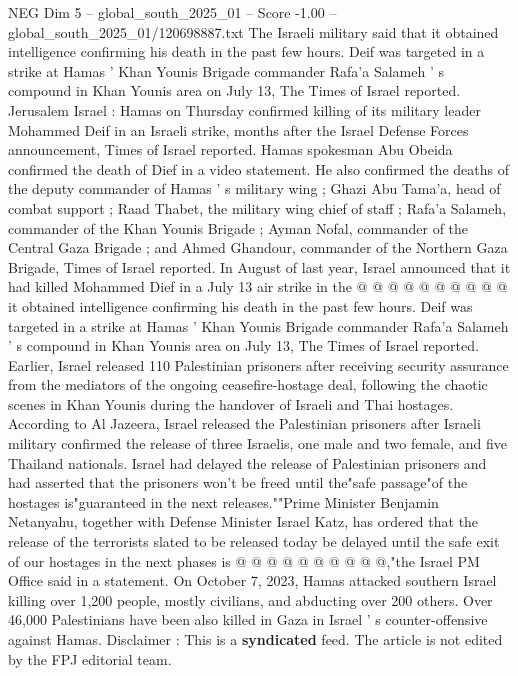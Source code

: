 \begin{textsample}{NEG Dim 5 – global\_south\_2025\_01 – Score -1.00 – global\_south\_2025\_01/120698887.txt}  \label{ex:f5_neg_151}
The Israeli military said that it obtained intelligence confirming his death in the past few hours.
Deif was targeted in a strike at Hamas ' Khan Younis Brigade commander Rafa'a Salameh ' s compound in Khan Younis area on July 13, The Times of Israel reported.
Jerusalem Israel : Hamas on Thursday confirmed killing of its military leader Mohammed Deif in an Israeli strike, months after the Israel Defense Forces announcement, Times of Israel reported.
Hamas spokesman Abu Obeida confirmed the death of Dief in a video statement.
He also confirmed the deaths of the deputy commander of Hamas ' s military wing ; Ghazi Abu Tama'a, head of combat support ; Raad Thabet, the military wing chief of staff ; Rafa'a Salameh, commander of the Khan Younis Brigade ; Ayman Nofal, commander of the Central Gaza Brigade ; and Ahmed Ghandour, commander of the Northern Gaza Brigade, Times of Israel reported.
In August of last year, Israel announced that it had killed Mohammed Dief in a July 13 air strike in the @ @ @ @ @ @ @ @ @ @ it obtained intelligence confirming his death in the past few hours.
Deif was targeted in a strike at Hamas ' Khan Younis Brigade commander Rafa'a Salameh ' s compound in Khan Younis area on July 13, The Times of Israel reported.
Earlier, Israel released 110 Palestinian prisoners after receiving security assurance from the mediators of the ongoing ceasefire-hostage deal, following the chaotic scenes in Khan Younis during the handover of Israeli and Thai hostages.
According to Al Jazeera, Israel released the Palestinian prisoners after Israeli military confirmed the release of three Israelis, one male and two female, and five Thailand nationals.
Israel had delayed the release of Palestinian prisoners and had asserted that the prisoners won't be freed until the"safe passage"of the hostages is"guaranteed in the next releases.""Prime Minister Benjamin Netanyahu, together with Defense Minister Israel Katz, has ordered that the release of the terrorists slated to be released today be delayed until the safe exit of our hostages in the next phases is @ @ @ @ @ @ @ @ @ @,"the Israel PM Office said in a statement.
On October 7, 2023, Hamas attacked southern Israel killing over 1,200 people, mostly civilians, and abducting over 200 others.
Over 46,000 Palestinians have been also killed in Gaza in Israel ' s counter-offensive against Hamas.
Disclaimer : This is a \textbf{syndicated} feed.
The article is not edited by the FPJ editorial team.

\end{textsample}
